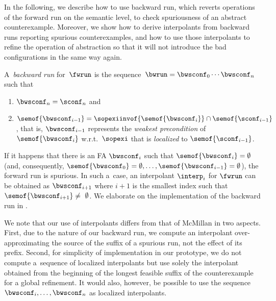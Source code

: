 In the following, we describe how to use backward run, which reverts operations
of the forward run on the semantic level, to check spuriousness of an abstract
counterexample.
Moreover, we show how to derive interpolants from backward runs reporting
spurious counterexamples, and how to use those interpolants to refine the
operation of abstraction so that it will not introduce the bad configurations
in the same way again.
%

A~\emph{backward run} for~$\fwrun$ 
is the sequence~$\bwrun = \bwsconf_0 \cdots \bwsconf_n$
such that
%
\begin{enumerate}
\item
$\bwsconf_n = \sconf_n$ 
and
\item
$\semof{\bwsconf_{i-1}} = \sopexiinvof{\semof{\bwsconf_{i}}} \cap \semof{\sconf_{i-1}}$, 
that is, ${\bwsconf_{i-1}}$ represents the \emph{weakest precondition} of
$\semof{\bwsconf_{i}}$ w.r.t.~$\sopexi$ that is \emph{localized} to
$\semof{\sconf_{i-1}}$.\vspace*{-0.5mm}
\end{enumerate}
%
If it happens that there is an FA $\bwsconf_i$ such that $\semof{\bwsconf_i} = \emptyset$ (and,
consequently, $\semof{\bwsconf_0} = \emptyset, \ldots, \semof{\bwsconf_{i-1}} =
\emptyset$), the forward run is spurious.
In such a~case,
an interpolant $\interp_i$ for $\fwrun$ can be obtained as $\bwsconf_{i+1}$ where $i+1$ is
the smallest index such that $\semof{\bwsconf_{i+1}}\neq~\emptyset$. 
%
We elaborate on the implementation of the backward run in
.

We note that our use of interpolants differs from that of McMillan
\cite{mcmillanCAV03} in two aspects. First, due to the nature of our backward
run, we compute an interpolant over-approximating the source of the suffix of a
spurious run, not the effect of its prefix. Second, for simplicity of
implementation in our prototype, we do not compute a~sequence of localized
interpolants but use solely the interpolant obtained from the beginning of the
longest feasible suffix of the counterexample for a global refinement. 
It would also, however, be possible to use the sequence
$\bwsconf_i,\ldots,\bwsconf_n$ as localized interpolants.


